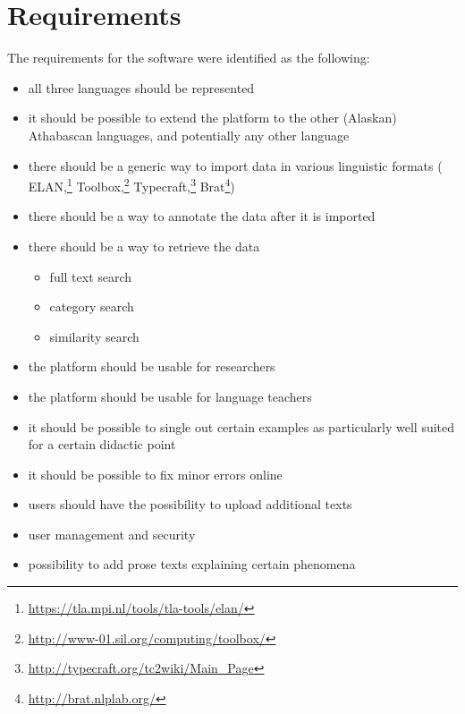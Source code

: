 \documentclass[a4paper,11pt]{article}
\begin{document}
\section{Requirements} 
The requirements for the software were identified as the following: 
\begin{itemize}
 \item all three languages should be represented 
 \item it should be possible to extend the platform to the other (Alaskan) Athabascan languages, and potentially any other language 
 \item there should be a generic way to import data in various linguistic formats 
 (%
ELAN,\footnote{\url{https://tla.mpi.nl/tools/tla-tools/elan/}} 
Toolbox,\footnote{\url{http://www-01.sil.org/computing/toolbox/}}
Typecraft,\footnote{\url{http://typecraft.org/tc2wiki/Main_Page}} 
Brat\footnote{\url{http://brat.nlplab.org/}})
 \item there should be a way to annotate the data after it is imported
 \item there should be a way to retrieve the data 
 \begin{itemize}
  \item full text search 
  \item category search 
  \item similarity search 
 \end{itemize}
 \item the platform should be usable for researchers 
 \item the platform should be usable for language teachers 
 \item it should be possible to single out certain examples as particularly well suited for a certain didactic point
 \item it should be possible to fix minor errors online 
 \item users should have the possibility to upload additional texts
 \item user management and security
 \item possibility to add prose texts explaining certain phenomena
\end{itemize}



\end{document}
